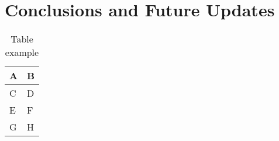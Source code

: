 
\chapter{Conclusions and Future Updates}
\label{chp:conclusions}

\begin{table}[ht]
    \centering
    \begin{tabular}{|l|l|}
    \hline
    \textbf{A} & \textbf{B} \\ \hline
    C          & D          \\ \hline
    E          & F          \\ \hline
    G          & H          \\ \hline
    \end{tabular}
    \caption{Table example \label{tab:table-name}}
\end{table}